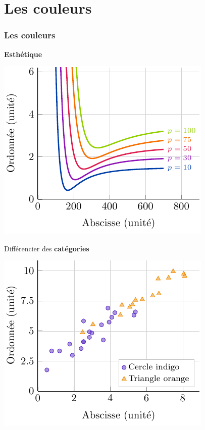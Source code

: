 \documentclass[aspectratio=169]{beamer}
\begin{document}
\section{Les couleurs}
\label{sec:les_couleurs}


\begin{frame}[c]\frametitle{Les couleurs}

\vspace{-2mm}
\begin{minipage}[t]{.49\textwidth}
\centering
\textbf{Esthétique}
\vspace*{3mm}

\includegraphics[scale=.45]{examples/lineplot_example.pdf}
\end{minipage}
\begin{minipage}[t]{.49\textwidth}
\centering
Différencier des \textbf{catégories}
\vspace*{3mm}

\includegraphics[scale=.45]{examples/scatterplot_example.pdf}
\end{minipage}



\end{frame}
\end{document}

